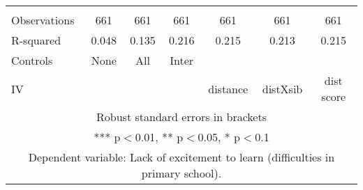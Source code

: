 \begin{tabular}{lcccccc}
 &  &  &  &  &  &  \\
Observations & 661 & 661 & 661 & 661 & 661 & 661 \\
R-squared & 0.048 & 0.135 & 0.216 & 0.215 & 0.213 & 0.215 \\
Controls & None & All & Inter &  &  &  \\
 IV &  &  &  & distance & distXsib & dist score \\ \hline
\multicolumn{7}{c}{ Robust standard errors in brackets} \\
\multicolumn{7}{c}{ *** p$<$0.01, ** p$<$0.05, * p$<$0.1} \\
\multicolumn{7}{c}{ Dependent variable: Lack of excitement to learn (difficulties in primary school).} \\
\end{tabular}
